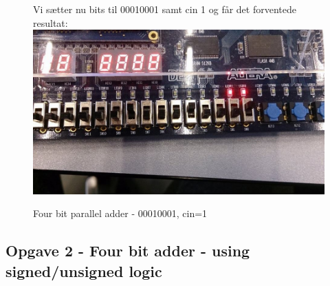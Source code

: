 \begin{enumerate}
	\begin{figure}[H]
			Vi sætter nu bits til 00010001 samt cin 1 og får det forventede resultat:
			\centering
			\includegraphics[scale=0.5]{pictures/Oevelse3/00010001_cin1.jpg}
			\caption{Four bit parallel adder - 00010001, cin=1}
			\label{fig:4bitFa00010001cin1}
		\end{figure}
		
\end{enumerate}
\newpage
\subsection{Opgave 2 - Four bit adder - using signed/unsigned logic}

